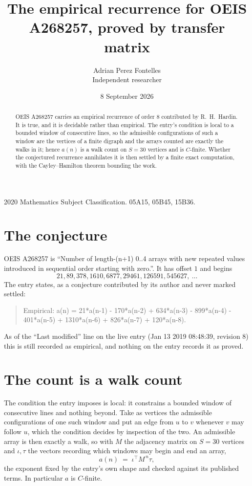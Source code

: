 \documentclass[11pt,a4paper]{article}
\title{The empirical recurrence for OEIS A268257, proved by transfer matrix}
\author{Adrian Perez Fontelles\\ \small Independent researcher}
\date{8 September 2026}
\theoremstyle{plain}
\theoremstyle{definition}
\begin{document}
\maketitle

\begin{abstract}
OEIS A268257 carries an empirical recurrence of order $8$ contributed by R.~H.~Hardin. It is
true, and it is decidable rather than empirical. The entry's condition is local to a bounded window of consecutive lines, so
the admissible configurations of such a window are the vertices of a finite digraph and the
arrays counted are exactly the walks in it; hence $a(n)$ is a walk count on $S=30$ vertices
and is $C$-finite. Whether the conjectured recurrence annihilates it is then settled by a
finite exact computation, with the Cayley--Hamilton theorem bounding the work.
\end{abstract}

\noindent\small 2020 Mathematics Subject Classification. 05A15, 05B45, 15B36.\normalsize

\section{The conjecture}

OEIS A268257 is ``Number of length-(n+1) 0..4 arrays with new repeated values introduced in sequential order starting with zero.''. It has offset $1$ and begins
\[
21, 89, 378, 1610, 6877, 29461, 126591, 545627,\ \dots
\]
The entry states, as a conjecture contributed by its author and never marked settled:
\begin{quote}
Empirical: a(n) = 21*a(n-1) - 170*a(n-2) + 634*a(n-3) - 899*a(n-4) - 401*a(n-5) + 1310*a(n-6) + 826*a(n-7) + 120*a(n-8).
\end{quote}
As of the ``Last modified'' line on the live entry (Jan 13 2019 08:48:39, revision 8) this is still
recorded as empirical, and nothing on the entry records it as proved.

\section{The count is a walk count}

The condition the entry imposes is local: it constrains a bounded window of consecutive lines and nothing beyond. Take as
vertices the admissible configurations of one such window and put an edge from $u$ to $v$
whenever $v$ may follow $u$, which the condition decides by inspection of the two. An
admissible array is then exactly a walk, so with $M$ the adjacency matrix on $S=30$ vertices
and $\iota,\tau$ the vectors recording which windows may begin and end an array,
\[
a(n)\;=\;\iota^{\!\top}M^{\,n}\tau ,
\]
the exponent fixed by the entry's own shape and checked against its published terms. In
particular $a$ is $C$-finite.
\end{document}
